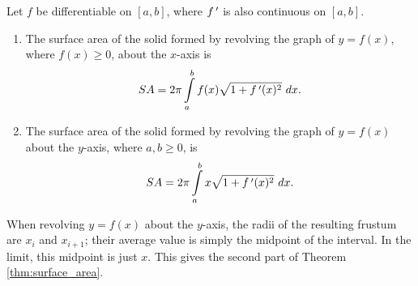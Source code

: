 \begin{theorem}\label{thm:surface_area}
Let $f$ be differentiable on  $[a,b]$, where $f\,'$ is also continuous on $[a,b]$. 
	\begin{enumerate}
	\item	The surface area of the solid formed by revolving the graph of $y=f(x)$, where $f(x)\geq0$, about the $x$-axis is
	$$SA = 2\pi\int\limits_a^b f(x)\sqrt{1+f\,'(x)^2}\ dx.$$
	\item	The surface area of the solid formed by revolving the graph of $y=f(x)$ about the $y$-axis, where $a,b\geq0$, is
	$$SA = 2\pi\int\limits_a^b x\sqrt{1+f\,'(x)^2}\ dx.$$
	\end{enumerate}
\end{theorem}

When revolving $y=f(x)$ about the $y$-axis, the radii of the resulting frustum are $x_i$ and $x_{i+1}$; their average value is simply the midpoint of the interval. In the limit, this midpoint is just $x$. This gives the second part of Theorem \ref{thm:surface_area}.

\ifanalysis

